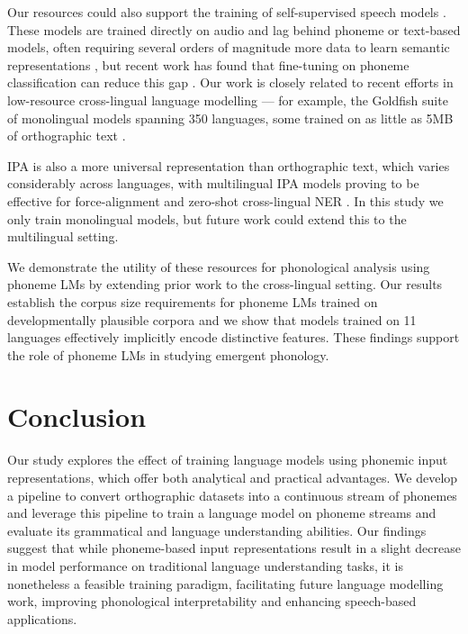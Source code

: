 Our resources could also support the training of self-supervised speech models \citep[e.g.][]{hsu2021hubert}. These models are trained directly on audio and lag behind phoneme or text-based models, often requiring several orders of magnitude more data to learn semantic representations \citep{cuervo2024scaling}, but recent work has found that fine-tuning on phoneme classification can reduce this gap \citep{feng-2023-language-universal-phonetic, poli2024improving}. Our work is closely related to recent efforts in low-resource cross-lingual language modelling --- for example, the Goldfish suite of monolingual models spanning 350 languages, some trained on as little as 5MB of orthographic text \citep{chang2024goldfish}.

IPA is also a more universal representation than orthographic text, which varies considerably across languages, with multilingual IPA models proving to be effective for force-alignment \citep{zhu-etal-2024-taste} and zero-shot cross-lingual NER \citep{sohn2024zero}. In this study we only train monolingual models, but future work could extend this to the multilingual setting.


We demonstrate the utility of these resources for phonological analysis using phoneme LMs by extending prior work to the cross-lingual setting. Our results establish the corpus size requirements for phoneme LMs trained on developmentally plausible corpora and we show that models trained on 11 languages effectively implicitly encode distinctive features. These findings support the role of phoneme LMs in studying emergent phonology. 

\section{Conclusion}

Our study explores the effect of training language models using phonemic input representations, which offer both analytical and practical advantages. We develop a pipeline to convert orthographic datasets into a continuous stream of phonemes and leverage this pipeline to train a language model on phoneme streams and evaluate its grammatical and language understanding abilities. Our findings suggest that while phoneme-based input representations result in a slight decrease in model performance on traditional language understanding tasks, it is nonetheless a feasible training paradigm, facilitating future language modelling work, improving phonological interpretability and enhancing speech-based applications.  

